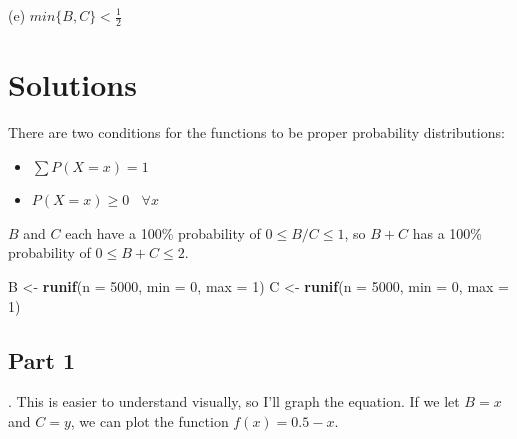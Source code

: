 \documentclass[]{article}
\newenvironment{Shaded}{\begin{snugshade}}{\end{snugshade}}
\newcommand{\KeywordTok}[1]{\textcolor[rgb]{0.13,0.29,0.53}{\textbf{#1}}}
\newcommand{\DataTypeTok}[1]{\textcolor[rgb]{0.13,0.29,0.53}{#1}}
\newcommand{\DecValTok}[1]{\textcolor[rgb]{0.00,0.00,0.81}{#1}}
\newcommand{\StringTok}[1]{\textcolor[rgb]{0.31,0.60,0.02}{#1}}
\newcommand{\NormalTok}[1]{#1}
\begin{document}
\indent (e) \(min\{B,C\} < \frac{1}{2}\)

\section{Solutions}\label{solutions}

There are two conditions for the functions to be proper probability
distributions:

\begin{itemize}
\item $\sum P(X = x) = 1$
\item $P(X = x) \geq 0 \ \ \ \ \forall x$
\end{itemize}

\(B\) and \(C\) each have a 100\% probability of \(0 \leq B/C \leq 1\),
so \(B + C\) has a 100\% probability of \(0 \leq B + C \leq 2\).

\begin{Shaded}
\begin{Highlighting}[]
\NormalTok{B <-}\StringTok{ }\KeywordTok{runif}\NormalTok{(}\DataTypeTok{n =} \DecValTok{5000}\NormalTok{, }\DataTypeTok{min =} \DecValTok{0}\NormalTok{, }\DataTypeTok{max =} \DecValTok{1}\NormalTok{)}
\NormalTok{C <-}\StringTok{ }\KeywordTok{runif}\NormalTok{(}\DataTypeTok{n =} \DecValTok{5000}\NormalTok{, }\DataTypeTok{min =} \DecValTok{0}\NormalTok{, }\DataTypeTok{max =} \DecValTok{1}\NormalTok{)}
\end{Highlighting}
\end{Shaded}

\subsection{Part 1}\label{part-1-1}

. This is easier to understand visually, so I'll graph the
equation. If we let \(B = x\) and \(C = y\), we can plot the function
\(f(x) = 0.5 - x\).
\end{document}
